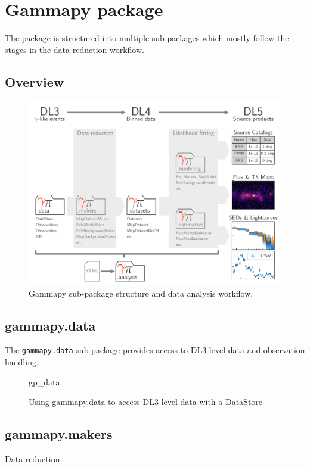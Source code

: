 \section{Gammapy package}
\label{sec:package}

The \gammapy package is structured into multiple sub-packages
which mostly follow the stages in the data reduction workflow.


\subsection{Overview}
\begin{figure}[t]
\centering
\includegraphics[width=1.\textwidth]{static/data-flow-gammapy}
\caption{
Gammapy sub-package structure and data analysis workflow.
}
\label{fig:workflow}
\end{figure}


\subsection{gammapy.data}
The \verb|gammapy.data| sub-package provides access to
DL3 level data and observation handling.


\begin{figure}

{gp_data}

\caption{Using gammapy.data to access DL3 level data with a DataStore}
\label{fig*:minted:gp_data}
\end{figure}



\subsection{gammapy.makers}
Data reduction

